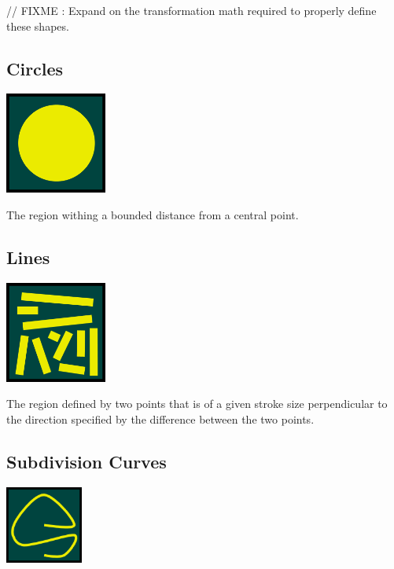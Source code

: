 \documentclass[12pt, letterpaper]{article}
\begin{document}
// FIXME : Expand on the transformation math required to properly define these shapes.

\subsection{Circles}

\begin{center}
\includegraphics[width=0.25\textwidth]{Circle.png}
\end{center}

The region withing a bounded distance from a central point.

\subsection{Lines}

\begin{center}
\includegraphics[width=0.25\textwidth]{Lines.png}
\end{center}

The region defined by two points that is of a given stroke size perpendicular to the direction specified by the difference between the two points.

\newpage
\subsection{Subdivision Curves}

\begin{center}
\includegraphics[width=0.19\textwidth]{SubLine.png}
\end{center}
\end{document}
